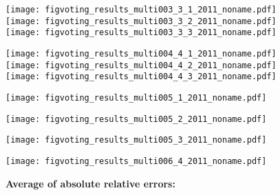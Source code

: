 \begin{frame}[plain]
\begin{frame}[plain]
\begin{frame}[plain]
\begin{frame}[plain]
\begin{frame}[plain]
\begin{frame}[plain]
\begin{frame}[plain]
\begin{frame}[plain]
\begin{frame}[plain]
\begin{frame}[plain]
\begin{frame}[plain]
\begin{frame}[plain]
\begin{frame}[plain]
\begin{frame}[plain]
\begin{frame}[plain]
\begin{frame}[plain]
\begin{frame}[plain]
\begin{frame}[plain]
\begin{frame}[plain]
\begin{frame}[plain]
\begin{frame}[plain]
\begin{frame}[plain]
\begin{frame}[plain]
\begin{frame}[plain]
  \texttt{[image: figvoting\_results\_multi003\_3\_1\_2011\_noname.pdf]}\\
  \texttt{[image: figvoting\_results\_multi003\_3\_2\_2011\_noname.pdf]}\\
  \texttt{[image: figvoting\_results\_multi003\_3\_3\_2011\_noname.pdf]}


  

  \texttt{[image: figvoting\_results\_multi004\_4\_1\_2011\_noname.pdf]}\\
  \texttt{[image: figvoting\_results\_multi004\_4\_2\_2011\_noname.pdf]}\\
  \texttt{[image: figvoting\_results\_multi004\_4\_3\_2011\_noname.pdf]}


\begin{frame}[plain]
  

  \texttt{[image: figvoting\_results\_multi005\_1\_2011\_noname.pdf]}


\begin{frame}[plain]
  

  \texttt{[image: figvoting\_results\_multi005\_2\_2011\_noname.pdf]}


\begin{frame}[plain]
  

  \texttt{[image: figvoting\_results\_multi005\_3\_2011\_noname.pdf]}


\begin{frame}[plain]
  

  \texttt{[image: figvoting\_results\_multi006\_4\_2011\_noname.pdf]}




  \small
  \textbf{Average of absolute relative errors:}


\end{frame}
\end{frame}
\end{frame}
\end{frame}
\end{frame}
\end{frame}
\end{frame}
\end{frame}
\end{frame}
\end{frame}
\end{frame}
\end{frame}
\end{frame}
\end{frame}
\end{frame}
\end{frame}
\end{frame}
\end{frame}
\end{frame}
\end{frame}
\end{frame}
\end{frame}
\end{frame}
\end{frame}
\end{frame}
\end{frame}
\end{frame}
\end{frame}
